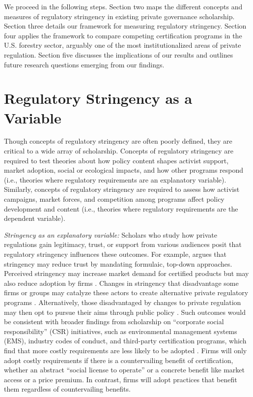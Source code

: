 \documentclass[
      12pt,
            Review ]{article}
\begin{document}
We proceed in the following steps. Section two maps the different concepts and measures of regulatory stringency in existing private governance scholarship. Section three details our framework for measuring regulatory stringency. Section four applies the framework to compare competing certification programs in the U.S. forestry sector, arguably one of the most institutionalized areas of private regulation. Section five discusses the implications of our results and outlines future research questions emerging from our findings.

\hypertarget{regulatory-stringency-as-a-variable}{%
\section{Regulatory Stringency as a Variable}\label{regulatory-stringency-as-a-variable}}

Though concepts of regulatory stringency are often poorly defined, they are critical to a wide array of scholarship. Concepts of regulatory stringency are required to test theories about how policy content shapes activist support, market adoption, social or ecological impacts, and how other programs respond (i.e., theories where regulatory requirements are an explanatory variable). Similarly, concepts of regulatory stringency are required to assess how activist campaigns, market forces, and competition among programs affect policy development and content (i.e., theories where regulatory requirements are the dependent variable).

\emph{Stringency as an explanatory variable:} Scholars who study how private regulations gain legitimacy, trust, or support from various audiences posit that regulatory stringency influences these outcomes. For example, \citet{McDermott2012} argues that stringency may reduce trust by mandating formulaic, top-down approaches. Perceived stringency may increase market demand for certified products \citep{Atkinson2014} but may also reduce adoption by firms \citep{Prado2013}. Changes in stringency that disadvantage some firms or groups may catalyze these actors to create alternative private regulatory programs \citep{Meidinger2003}. Alternatively, those disadvantaged by changes to private regulation may then opt to pursue their aims through public policy \citep{Weimer2006}. Such outcomes would be consistent with broader findings from scholarship on ``corporate social responsibility'' (CSR) initiatives, such as environmental management systems (EMS), industry codes of conduct, and third-party certification programs, which find that more costly requirements are less likely to be adopted \citep{Delmas2008, Kollman2001, Lyon2008}. Firms will only adopt costly requirements if there is a countervailing benefit of certification, whether an abstract ``social license to operate'' or a concrete benefit like market access or a price premium. In contrast, firms will adopt practices that benefit them regardless of countervailing benefits.
\end{document}
